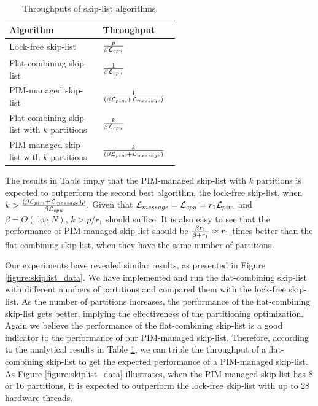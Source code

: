 \begin{table}[ht!]
\begin{center}
    \begin{tabular}{| m{0.55\linewidth}  | l |}
    \hline
    Algorithm & Throughput\\ \hline
    Lock-free skip-list & ${p \over \beta\mathcal{L}_{cpu}}$ \\ \hline
    Flat-combining skip-list & ${1 \over \beta\mathcal{L}_{cpu}}$ \\ \hline
    PIM-managed skip-list & ${1 \over (\beta\mathcal{L}_{pim} + \mathcal{L}_{message})}$ \\ \hline
    Flat-combining skip-list with $k$ partitions & ${k \over \beta\mathcal{L}_{cpu}}$ \\ \hline
    PIM-managed skip-list with $k$ partitions & ${k \over (\beta\mathcal{L}_{pim} + \mathcal{L}_{message})}$ \\ \hline
    \end{tabular}
\end{center}
\caption{Throughputs of skip-list algorithms.}
\label{tab:skiplist}
\end{table}

The results in Table imply that the PIM-managed skip-list with $k$ partitions is expected to outperform 
the second best algorithm, the lock-free skip-list, when $k > {(\beta\mathcal{L}_{pim} + \mathcal{L}_{message})p \over \beta\mathcal{L}_{cpu}}$.
Given that $\mathcal{L}_{message} = \mathcal{L}_{cpu} = r_1\mathcal{L}_{pim}$ and $\beta = \Theta(\log N)$, $k > p/r_1$ should suffice.
It is also easy to see that the performance of PIM-managed skip-list should be 
${\beta r_1 \over \beta + r_1} \approx r_1$ times better than the flat-combining skip-list, 
when they have the same number of partitions. 

Our experiments have revealed similar results, 
as presented in Figure \ref{figure:skiplist_data}.
We have implemented and run the flat-combining skip-list with different numbers of
partitions and compared them with the lock-free skip-list.
As the number of partitions increases, the performance of the flat-combining skip-list
gets better, implying the effectiveness of the partitioning optimization.
Again we believe the performance of the flat-combining skip-list is a good indicator
to the performance of our PIM-managed skip-list.
Therefore, according to the analytical results in Table \ref{tab:skiplist}, we can triple the throughput 
of a flat-combining skip-list to get the expected performance of a PIM-managed skip-list.
As Figure \ref{figure:skiplist_data} illustrates, when the PIM-managed skip-list has $8$ or $16$ 
partitions, it is expected to outperform the lock-free skip-list with up to 28 hardware threads.

